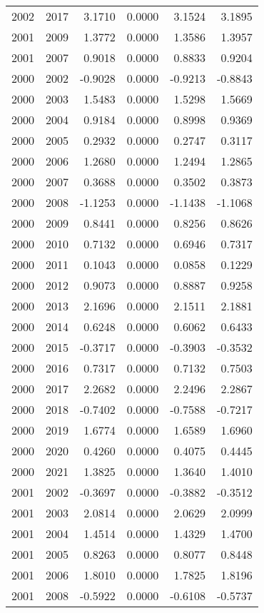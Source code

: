 \begin{tabular}{llrrrr}
2002 & 2017 & 3.1710 & 0.0000 & 3.1524 & 3.1895 \\
2001 & 2009 & 1.3772 & 0.0000 & 1.3586 & 1.3957 \\
2001 & 2007 & 0.9018 & 0.0000 & 0.8833 & 0.9204 \\
2000 & 2002 & -0.9028 & 0.0000 & -0.9213 & -0.8843 \\
2000 & 2003 & 1.5483 & 0.0000 & 1.5298 & 1.5669 \\
2000 & 2004 & 0.9184 & 0.0000 & 0.8998 & 0.9369 \\
2000 & 2005 & 0.2932 & 0.0000 & 0.2747 & 0.3117 \\
2000 & 2006 & 1.2680 & 0.0000 & 1.2494 & 1.2865 \\
2000 & 2007 & 0.3688 & 0.0000 & 0.3502 & 0.3873 \\
2000 & 2008 & -1.1253 & 0.0000 & -1.1438 & -1.1068 \\
2000 & 2009 & 0.8441 & 0.0000 & 0.8256 & 0.8626 \\
2000 & 2010 & 0.7132 & 0.0000 & 0.6946 & 0.7317 \\
2000 & 2011 & 0.1043 & 0.0000 & 0.0858 & 0.1229 \\
2000 & 2012 & 0.9073 & 0.0000 & 0.8887 & 0.9258 \\
2000 & 2013 & 2.1696 & 0.0000 & 2.1511 & 2.1881 \\
2000 & 2014 & 0.6248 & 0.0000 & 0.6062 & 0.6433 \\
2000 & 2015 & -0.3717 & 0.0000 & -0.3903 & -0.3532 \\
2000 & 2016 & 0.7317 & 0.0000 & 0.7132 & 0.7503 \\
2000 & 2017 & 2.2682 & 0.0000 & 2.2496 & 2.2867 \\
2000 & 2018 & -0.7402 & 0.0000 & -0.7588 & -0.7217 \\
2000 & 2019 & 1.6774 & 0.0000 & 1.6589 & 1.6960 \\
2000 & 2020 & 0.4260 & 0.0000 & 0.4075 & 0.4445 \\
2000 & 2021 & 1.3825 & 0.0000 & 1.3640 & 1.4010 \\
2001 & 2002 & -0.3697 & 0.0000 & -0.3882 & -0.3512 \\
2001 & 2003 & 2.0814 & 0.0000 & 2.0629 & 2.0999 \\
2001 & 2004 & 1.4514 & 0.0000 & 1.4329 & 1.4700 \\
2001 & 2005 & 0.8263 & 0.0000 & 0.8077 & 0.8448 \\
2001 & 2006 & 1.8010 & 0.0000 & 1.7825 & 1.8196 \\
2001 & 2008 & -0.5922 & 0.0000 & -0.6108 & -0.5737 \\

\end{tabular}
